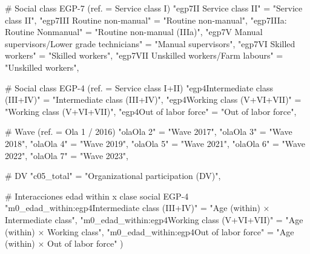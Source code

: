 \documentclass[
  spanish,
  a4paper,
  oneside]{scrbook}
\newenvironment{Shaded}{\begin{snugshade}}{\end{snugshade}}
\newcommand{\CommentTok}[1]{\textcolor[rgb]{0.37,0.37,0.37}{#1}}
\newcommand{\NormalTok}[1]{\textcolor[rgb]{0.00,0.23,0.31}{#1}}
\newcommand{\OtherTok}[1]{\textcolor[rgb]{0.00,0.23,0.31}{#1}}
\newcommand{\StringTok}[1]{\textcolor[rgb]{0.13,0.47,0.30}{#1}}
\begin{document}
\begin{Shaded}
\begin{Highlighting}[]
  \CommentTok{\# Social class EGP{-}7 (ref. = Service class I)}
  \StringTok{"egp7\textquotesingle{}II  Service class II\textquotesingle{}"}                           \OtherTok{=} \StringTok{"Service class II"}\NormalTok{,}
  \StringTok{"egp7\textquotesingle{}III Routine non{-}manual\textquotesingle{}"}                         \OtherTok{=} \StringTok{"Routine non{-}manual"}\NormalTok{,}
  \StringTok{"egp7\textquotesingle{}IIIa: Routine Nonmanual\textquotesingle{}"}                        \OtherTok{=} \StringTok{"Routine non{-}manual (IIIa)"}\NormalTok{,}
  \StringTok{"egp7\textquotesingle{}V   Manual supervisors/Lower grade technicians\textquotesingle{}"} \OtherTok{=} \StringTok{"Manual supervisors"}\NormalTok{,}
  \StringTok{"egp7\textquotesingle{}VI  Skilled workers\textquotesingle{}"}                            \OtherTok{=} \StringTok{"Skilled workers"}\NormalTok{,}
  \StringTok{"egp7\textquotesingle{}VII Unskilled workers/Farm labours\textquotesingle{}"}             \OtherTok{=} \StringTok{"Unskilled workers"}\NormalTok{,}

  \CommentTok{\# Social class EGP{-}4 (ref. = Service class I+II)}
  \StringTok{"egp4Intermediate class (III+IV)"}                    \OtherTok{=} \StringTok{"Intermediate class (III+IV)"}\NormalTok{,}
  \StringTok{"egp4Working class (V+VI+VII)"}                       \OtherTok{=} \StringTok{"Working class (V+VI+VII)"}\NormalTok{,}
  \StringTok{"egp4Out of labor force"}                             \OtherTok{=} \StringTok{"Out of labor force"}\NormalTok{,}

  \CommentTok{\# Wave (ref. = Ola 1 / 2016)}
  \StringTok{"olaOla 2"} \OtherTok{=} \StringTok{"Wave 2017"}\NormalTok{,}
  \StringTok{"olaOla 3"} \OtherTok{=} \StringTok{"Wave 2018"}\NormalTok{,}
  \StringTok{"olaOla 4"} \OtherTok{=} \StringTok{"Wave 2019"}\NormalTok{,}
  \StringTok{"olaOla 5"} \OtherTok{=} \StringTok{"Wave 2021"}\NormalTok{,}
  \StringTok{"olaOla 6"} \OtherTok{=} \StringTok{"Wave 2022"}\NormalTok{,}
  \StringTok{"olaOla 7"} \OtherTok{=} \StringTok{"Wave 2023"}\NormalTok{,}

  \CommentTok{\# DV}
  \StringTok{"c05\_total"} \OtherTok{=} \StringTok{"Organizational participation (DV)"}\NormalTok{,}

  \CommentTok{\# Interacciones edad within x clase social EGP{-}4}
  \StringTok{"m0\_edad\_within:egp4Intermediate class (III+IV)"}    \OtherTok{=} \StringTok{"Age (within) × Intermediate class"}\NormalTok{,}
  \StringTok{"m0\_edad\_within:egp4Working class (V+VI+VII)"}       \OtherTok{=} \StringTok{"Age (within) × Working class"}\NormalTok{,}
  \StringTok{"m0\_edad\_within:egp4Out of labor force"}             \OtherTok{=} \StringTok{"Age (within) × Out of labor force"}
\NormalTok{) }
\end{Highlighting}
\end{Shaded}
\end{document}
